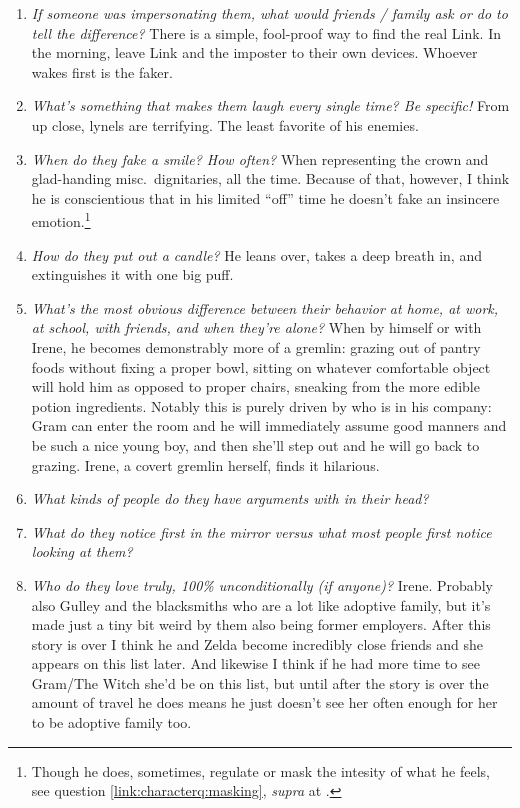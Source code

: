 \begin{enumerate}
    \item\textit{If someone was impersonating them, what would friends / family ask or do to tell the difference?}
        There is a simple, fool-proof way to find the real Link. In the morning, leave Link and the imposter to their own devices. Whoever wakes first is the faker.
    \item\textit{What’s something that makes them laugh every single time? Be specific!}
        From up close, lynels are terrifying. The least favorite of his enemies. 
    \item\textit{When do they fake a smile? How often?}
        When representing the crown and glad-handing misc.~dignitaries, all the time. Because of that, however, I think he is conscientious that in his limited ``off'' time he doesn't fake an insincere emotion.\footnote{Though he does, sometimes, regulate or mask the intesity of what he feels, see question \ref{link:characterq:masking}, \textit{supra} at \pageref{link:characterq:masking}.}
    \item\textit{How do they put out a candle?}
        He leans over, takes a deep breath in, and extinguishes it with one big puff. 
    \item\textit{What’s the most obvious difference between their behavior at home, at work, at school, with friends, and when they’re alone?}
        When by himself or with Irene, he becomes demonstrably more of a gremlin: grazing out of pantry foods without fixing a proper bowl, sitting on whatever comfortable object will hold him as opposed to proper chairs, sneaking from the more edible potion ingredients. Notably this is purely driven by who is in his company: Gram can enter the room and he will immediately assume good manners and be such a nice young boy, and then she'll step out and he will go back to grazing. Irene, a covert gremlin herself, finds it hilarious.
    \item\textit{What kinds of people do they have arguments with in their head?}
    \item\textit{What do they notice first in the mirror versus what most people first notice looking at them?} 
    \item\textit{Who do they love truly, 100\% unconditionally (if anyone)?}
        Irene. Probably also Gulley and the blacksmiths who are a lot like adoptive family, but it's made just a tiny bit weird by them also being former employers. After this story is over I think he and Zelda become incredibly close friends and she appears on this list later. And likewise I think if he had more time to see Gram/The Witch she'd be on this list, but until after the story is over the amount of travel he does means he just doesn't see her often enough for her to be adoptive family too.

\end{enumerate}
